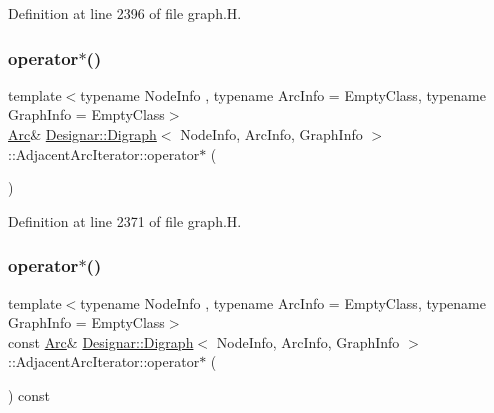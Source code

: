 Definition at line 2396 of file graph.\+H.

\mbox{\label{class_designar_1_1_digraph_1_1_adjacent_arc_iterator_a2a1ee85a8076e07fd99d35676ec69887}} 
\subsubsection{\texorpdfstring{operator$\ast$()}{operator*()}\hspace{0.1cm}{\footnotesize\ttfamily [1/2]}}
{\footnotesize\ttfamily template$<$typename Node\+Info , typename Arc\+Info  = Empty\+Class, typename Graph\+Info  = Empty\+Class$>$ \\
\hyperlink{class_designar_1_1_digraph_a0ceb278671f2a535c00fddccdeafd69f}{Arc}\& \hyperlink{class_designar_1_1_digraph}{Designar\+::\+Digraph}$<$ Node\+Info, Arc\+Info, Graph\+Info $>$\+::Adjacent\+Arc\+Iterator\+::operator$\ast$ (\begin{DoxyParamCaption}{ }\end{DoxyParamCaption})\hspace{0.3cm}{\ttfamily [inline]}}



Definition at line 2371 of file graph.\+H.

\mbox{\label{class_designar_1_1_digraph_1_1_adjacent_arc_iterator_aaf54c97702c3b6e3ccf419c2f7966e44}} 
\subsubsection{\texorpdfstring{operator$\ast$()}{operator*()}\hspace{0.1cm}{\footnotesize\ttfamily [2/2]}}
{\footnotesize\ttfamily template$<$typename Node\+Info , typename Arc\+Info  = Empty\+Class, typename Graph\+Info  = Empty\+Class$>$ \\
const \hyperlink{class_designar_1_1_digraph_a0ceb278671f2a535c00fddccdeafd69f}{Arc}\& \hyperlink{class_designar_1_1_digraph}{Designar\+::\+Digraph}$<$ Node\+Info, Arc\+Info, Graph\+Info $>$\+::Adjacent\+Arc\+Iterator\+::operator$\ast$ (\begin{DoxyParamCaption}{ }\end{DoxyParamCaption}) const\hspace{0.3cm}{\ttfamily [inline]}}



